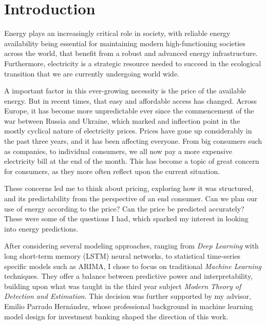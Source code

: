 \documentclass[12pt]{report} %
\begin{document}
\clearpage
{} %





\chapter{Introduction}

Energy plays an increasingly critical role in society, with reliable energy availability being essential for maintaining modern high-functioning societies across the world, that benefit from a robust and advanced energy infrastructure. Furthermore, electricity is a strategic resource needed to succeed in the ecological transition that we are currently undergoing world wide.

A important factor in this ever-growing necessity is the price of the available energy. But in recent times, that easy and affordable access has changed. Across Europe, it has become more unpredictable ever since the commencement of the war between Russia and Ukraine, which marked and inflection point in the mostly cyclical nature of electricity prices. Prices have gone up considerably in the past three years, and it has been affecting everyone. From big consumers such as companies, to individual consumers, we all now pay a more expensive electricity bill at the end of the month. This has become a topic of great concern for consumers, as they more often reflect upon the current situation.

These concerns led me to think about pricing, exploring how it was structured, and its predictability from the perspective of an end consumer. Can we plan our use of energy according to the price? Can the price be predicted accurately? These were some of the questions I had, which sparked my interest in looking into energy predictions.

After considering several modeling approaches, ranging from \textit{Deep Learning} with long short-term memory (LSTM) neural networks, to statistical time-series specific models such as ARIMA, I chose to focus on traditional \textit{Machine Learning} techniques. They offer a balance between predictive power and interpretability, building upon what was taught in the third year subject \textit{Modern Theory of Detection and Estimation}. This decision was further supported by my advisor, Emilio Parrado Hernández, whose professional background in machine learning model design for investment banking shaped the direction of this work.
\end{document}
